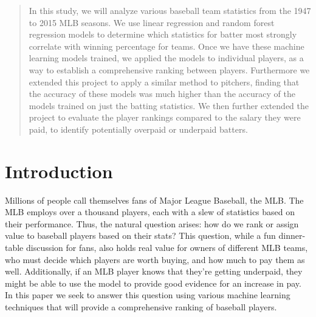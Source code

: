 \documentclass{article}
\begin{document}

\begin{abstract}
In this study, we will analyze various baseball team statistics from the 1947 to 2015 MLB seasons. We use linear regression and random forest regression models to determine which statistics for batter most strongly correlate with winning percentage for teams. Once we have these machine learning models trained, we applied the models to individual players, as a way to establish a comprehensive ranking between players. Furthermore we extended this project to apply a similar method to pitchers, finding that the accuracy of these models was much higher than the accuracy of the models trained on just the batting statistics. We then further extended the project to evaluate the player rankings compared to the salary they were paid, to identify potentially overpaid or underpaid batters.
\end{abstract}

\section{Introduction}
\label{introduction}

	Millions of people call themselves fans of Major League Baseball, the MLB. The MLB employs over a thousand players, each with a slew of statistics based on their performance. Thus, the natural question arises: how do we rank or assign value to baseball players based on their stats? This question, while a fun dinner-table discussion for fans, also holds real value for owners of different MLB teams, who must decide which players are worth buying, and how much to pay them as well. Additionally, if an MLB player knows that they’re getting underpaid, they might be able to use the model to provide good evidence for an increase in pay. In this paper we seek to answer this question using various machine learning techniques that will provide a comprehensive ranking of baseball players.
	
\end{document}
